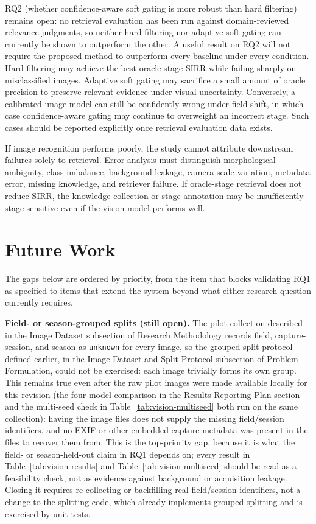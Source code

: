 \documentclass[conference]{IEEEtran}
\begin{document}
RQ2 (whether confidence-aware soft gating is more robust than hard filtering) remains open: no retrieval evaluation has been run against domain-reviewed relevance judgments, so neither hard filtering nor adaptive soft gating can currently be shown to outperform the other. A useful result on RQ2 will not require the proposed method to outperform every baseline under every condition. Hard filtering may achieve the best oracle-stage SIRR while failing sharply on misclassified images. Adaptive soft gating may sacrifice a small amount of oracle precision to preserve relevant evidence under visual uncertainty. Conversely, a calibrated image model can still be confidently wrong under field shift, in which case confidence-aware gating may continue to overweight an incorrect stage. Such cases should be reported explicitly once retrieval evaluation data exists.

If image recognition performs poorly, the study cannot attribute downstream failures solely to retrieval. Error analysis must distinguish morphological ambiguity, class imbalance, background leakage, camera-scale variation, metadata error, missing knowledge, and retriever failure. If oracle-stage retrieval does not reduce SIRR, the knowledge collection or stage annotation may be insufficiently stage-sensitive even if the vision model performs well.

\section{Future Work}
\label{sec:future-work}
The gaps below are ordered by priority, from the item that blocks validating RQ1 as specified to items that extend the system beyond what either research question currently requires.

\textbf{Field- or season-grouped splits (still open).} The pilot collection described in the Image Dataset subsection of Research Methodology records field, capture-session, and season as \texttt{unknown} for every image, so the grouped-split protocol defined earlier, in the Image Dataset and Split Protocol subsection of Problem Formulation, could not be exercised: each image trivially forms its own group. This remains true even after the raw pilot images were made available locally for this revision (the four-model comparison in the Results Reporting Plan section and the multi-seed check in Table~\ref{tab:vision-multiseed} both run on the same collection): having the image files does not supply the missing field/session identifiers, and no EXIF or other embedded capture metadata was present in the files to recover them from. This is the top-priority gap, because it is what the field- or season-held-out claim in RQ1 depends on; every result in Table~\ref{tab:vision-results} and Table~\ref{tab:vision-multiseed} should be read as a feasibility check, not as evidence against background or acquisition leakage. Closing it requires re-collecting or backfilling real field/session identifiers, not a change to the splitting code, which already implements grouped splitting and is exercised by unit tests.
\end{document}
